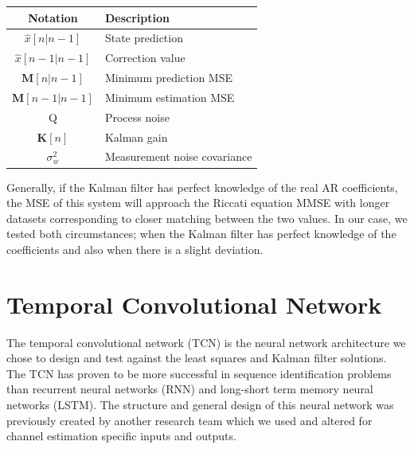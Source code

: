 \documentclass[twocolumn,letterpaper]{IEEEAerospaceCLS}  %
\begin{document}
\begin{table}[h!]
\centering
\begin{tabular}{|c|l|}
\hline
Notation           & Description \\ \hline              
\multirow{2}{*}{$\hat{x}[n|n-1]$} & \multirow{2}{*}{State prediction} \\
                   & \\ \hline
\multirow{2}{*}{$\hat{x}[n-1|n-1]$} & \multirow{2}{*}{Correction value} \\
                   & \\ \hline
\multirow{2}{*}{$\textbf{M}[n|n-1]$} & \multirow{2}{*}{Minimum prediction MSE} \\
                   & \\ \hline
\multirow{2}{*}{$\textbf{M}[n-1|n-1]$} & \multirow{2}{*}{Minimum estimation MSE} \\
                   & \\ \hline
\multirow{2}{*}{Q} & \multirow{2}{*}{Process noise} \\
                   & \\ \hline
\multirow{2}{*}{$\textbf{K}[n]$} & \multirow{2}{*}{Kalman gain} \\
                   & \\ \hline
\multirow{2}{*}{$\sigma_{w}^2$} & \multirow{2}{*}{Measurement noise covariance} \\
                   & \\ \hline
\end{tabular}
\end{table}

Generally, if the Kalman filter has perfect knowledge of the real AR coefficients, the MSE of this system will approach the Riccati equation MMSE with longer datasets corresponding to closer matching between the two values. In our case, we tested both circumstances; when the Kalman filter has perfect knowledge of the coefficients and also when there is a slight deviation. 

\section{Temporal Convolutional Network}
\label{sec:TCN}

The temporal convolutional network (TCN) is the neural network architecture we chose to design and test against the least squares and Kalman filter solutions. The TCN has proven to be more successful in sequence identification problems than recurrent neural networks (RNN) and long-short term memory neural networks (LSTM). The structure and general design of this neural network was previously created by another research team \cite{BaiTCN2018} which we used and altered for channel estimation specific inputs and outputs. 
\end{document}
